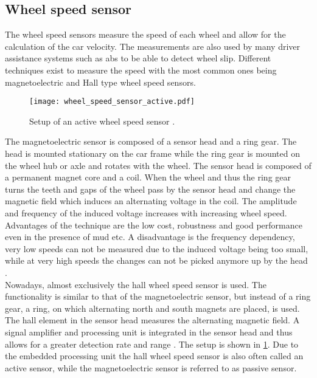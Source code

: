 \subsection{Wheel speed sensor}
The wheel speed sensors measure the speed of each wheel and allow for the calculation of the car velocity.
The measurements are also used by many driver assistance systems such as \gls{abs} to be able to detect wheel slip.
Different techniques exist to measure the speed with the most common ones being magnetoelectric and Hall type wheel speed sensors.\\
\begin{figure}[htb]
	\centering
	\texttt{[image: wheel\_speed\_sensor\_active.pdf]}
	\caption[Setup of an active wheel speed sensor]{Setup of an active wheel speed sensor \cite{Re2011}.}
	\label{fig:wheel_speed_sensor_active}
\end{figure}
The magnetoelectric sensor is composed of a sensor head and a ring gear.
The head is mounted stationary on the car frame while the ring gear is mounted on the wheel hub or axle and rotates with the wheel.
The sensor head is composed of a permanent magnet core and a coil.
When the wheel and thus the ring gear turns the teeth and gaps of the wheel pass by the sensor head and change the magnetic field which induces an alternating voltage in the coil.
The amplitude and frequency of the induced voltage increases with increasing wheel speed.
Advantages of the technique are the low cost, robustness and good performance even in the presence of mud etc.
A disadvantage is the frequency dependency, very low speeds can not be measured due to the induced voltage being too small, while at very high speeds the changes can not be picked anymore up by the head \cite{AutoReif2014}.\\
Nowadays, almost exclusively the hall wheel speed sensor is used.
The functionality is similar to that of the magnetoelectric sensor, but instead of a ring gear, a ring, on which alternating north and south magnets are placed, is used.
The hall element in the sensor head measures the alternating magnetic field.
A signal amplifier and processing unit is integrated in the sensor head and thus allows for a greater detection rate and range \cite{Re2011}.
The setup is shown in \cref{fig:wheel_speed_sensor_active}.
Due to the embedded processing unit the hall wheel speed sensor is also often called an active sensor, while the magnetoelectric sensor is referred to as passive sensor.



